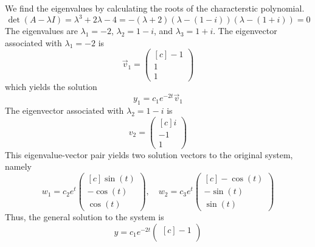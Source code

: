 \documentclass[11pt, titlepage]{article}
\begin{document}
  \begin{solution}
    We find the eigenvalues by calculating the roots of the characterstic polynomial.
    \begin{equation*}
      \det(A - \lambda I) = \lambda^{3} + 2 \lambda - 4 = -(\lambda + 2) (\lambda - (1 - i)) (\lambda - (1 + i)) = 0
    \end{equation*}
    The eigenvalues are \(\lambda_{1} = -2\), \(\lambda_{2} = 1 - i\), and \(\lambda_{3} = 1 + i\).
    The eigenvector associated with \(\lambda_{1} = -2\) is
    \begin{equation*}
      \vec{v}_{1} =
      \begin{pmatrix*}[c]
        -1 \\
        1 \\
        1
      \end{pmatrix*}
    \end{equation*}
    which yields the solution
    \begin{equation*}
      y_{1} = c_{1} e^{-2t} \vec{v}_{1}
    \end{equation*}
    The eigenvector associated with \(\lambda_{2} = 1 - i\) is
    \begin{equation*}
      v_{2} =
      \begin{pmatrix*}[c]
        i \\
        -1 \\
        1
      \end{pmatrix*}
    \end{equation*}
    This eigenvalue-vector pair yields two solution vectors to the original system, namely
    \begin{equation*}
      w_{1} = c_{2} e^{t}
      \begin{pmatrix*}[c]
        \sin(t) \\
        -\cos(t) \\
        \cos(t)
      \end{pmatrix*}, \quad
      w_{2} = c_{3} e^{t}
      \begin{pmatrix*}[c]
        -\cos(t) \\
        -\sin(t) \\
        \sin(t)
      \end{pmatrix*}
    \end{equation*}
    Thus, the general solution to the system is
    \begin{equation*}
      y = c_{1} e^{-2t}
      \begin{pmatrix*}[c]
        -1 \\

\end{pmatrix*}
\end{equation*}
\end{solution}
\end{document}
